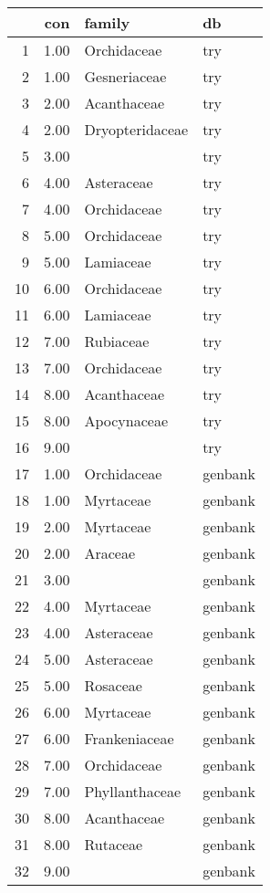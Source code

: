 \begin{tabular}{rrll}
  \toprule
 & con & family & db \\ 
  \midrule
1 & 1.00 & Orchidaceae & try \\ 
  2 & 1.00 & Gesneriaceae & try \\ 
  3 & 2.00 & Acanthaceae & try \\ 
  4 & 2.00 & Dryopteridaceae & try \\ 
  5 & 3.00 &  & try \\ 
  6 & 4.00 & Asteraceae & try \\ 
  7 & 4.00 & Orchidaceae & try \\ 
  8 & 5.00 & Orchidaceae & try \\ 
  9 & 5.00 & Lamiaceae & try \\ 
  10 & 6.00 & Orchidaceae & try \\ 
  11 & 6.00 & Lamiaceae & try \\ 
  12 & 7.00 & Rubiaceae & try \\ 
  13 & 7.00 & Orchidaceae & try \\ 
  14 & 8.00 & Acanthaceae & try \\ 
  15 & 8.00 & Apocynaceae & try \\ 
  16 & 9.00 &  & try \\ 
  17 & 1.00 & Orchidaceae & genbank \\ 
  18 & 1.00 & Myrtaceae & genbank \\ 
  19 & 2.00 & Myrtaceae & genbank \\ 
  20 & 2.00 & Araceae & genbank \\ 
  21 & 3.00 &  & genbank \\ 
  22 & 4.00 & Myrtaceae & genbank \\ 
  23 & 4.00 & Asteraceae & genbank \\ 
  24 & 5.00 & Asteraceae & genbank \\ 
  25 & 5.00 & Rosaceae & genbank \\ 
  26 & 6.00 & Myrtaceae & genbank \\ 
  27 & 6.00 & Frankeniaceae & genbank \\ 
  28 & 7.00 & Orchidaceae & genbank \\ 
  29 & 7.00 & Phyllanthaceae & genbank \\ 
  30 & 8.00 & Acanthaceae & genbank \\ 
  31 & 8.00 & Rutaceae & genbank \\ 
  32 & 9.00 &  & genbank \\ 
   \bottomrule
\end{tabular}

